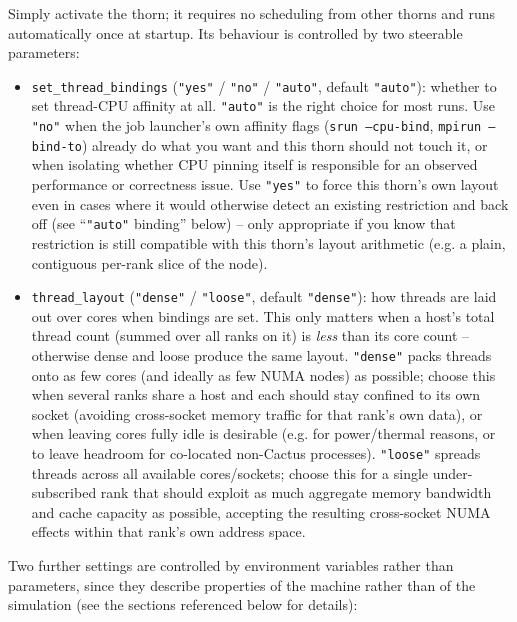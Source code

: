Simply activate the thorn; it requires no scheduling from other
thorns and runs automatically once at startup. Its behaviour is
controlled by two steerable parameters:
\begin{itemize}
\item \texttt{set\_thread\_bindings} (\texttt{"yes"} / \texttt{"no"} /
  \texttt{"auto"}, default \texttt{"auto"}): whether to set thread-CPU
  affinity at all. \texttt{"auto"} is the right choice for most runs.
  Use \texttt{"no"} when the job launcher's own affinity flags
  (\texttt{srun --cpu-bind}, \texttt{mpirun --bind-to}) already do what
  you want and this thorn should not touch it, or when isolating
  whether CPU pinning itself is responsible for an observed
  performance or correctness issue. Use \texttt{"yes"} to force this
  thorn's own layout even in cases where it would otherwise detect an
  existing restriction and back off (see ``\texttt{"auto"} binding''
  below) -- only appropriate if you know that restriction is still
  compatible with this thorn's layout arithmetic (e.g. a plain,
  contiguous per-rank slice of the node).
\item \texttt{thread\_layout} (\texttt{"dense"} / \texttt{"loose"},
  default \texttt{"dense"}): how threads are laid out over cores when
  bindings are set. This only matters when a host's total thread count
  (summed over all ranks on it) is \emph{less} than its core count --
  otherwise dense and loose produce the same layout. \texttt{"dense"}
  packs threads onto as few cores (and ideally as few NUMA nodes) as
  possible; choose this when several ranks share a host and each
  should stay confined to its own socket (avoiding cross-socket memory
  traffic for that rank's own data), or when leaving cores fully idle
  is desirable (e.g. for power/thermal reasons, or to leave headroom
  for co-located non-Cactus processes). \texttt{"loose"} spreads
  threads across all available cores/sockets; choose this for a single
  under-subscribed rank that should exploit as much aggregate memory
  bandwidth and cache capacity as possible, accepting the resulting
  cross-socket NUMA effects within that rank's own address space.
\end{itemize}
Two further settings are controlled by environment variables rather
than parameters, since they describe properties of the machine rather
than of the simulation (see the sections referenced below for details):
